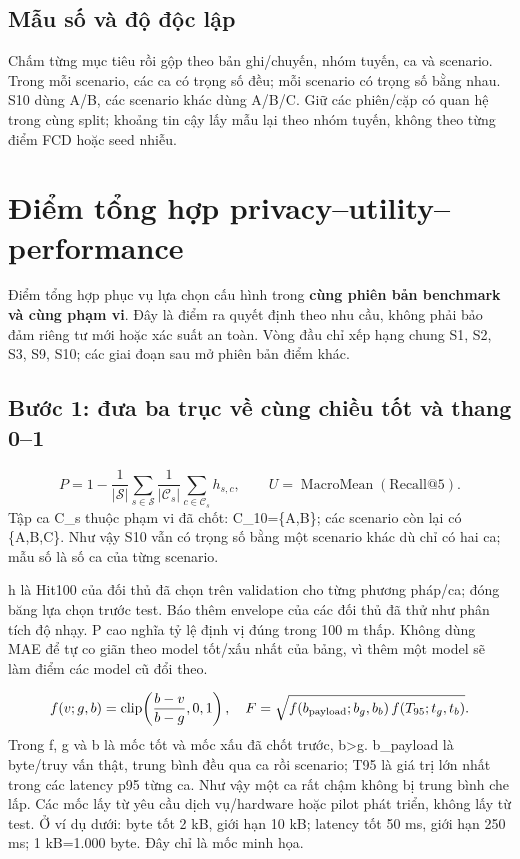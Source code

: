 \documentclass[10pt,a4paper]{article}
\begin{document}
\subsection{Mẫu số và độ độc lập}
Chấm từng mục tiêu rồi gộp theo bản ghi/chuyến, nhóm tuyến, ca và scenario. Trong mỗi scenario, các ca có trọng số đều; mỗi scenario có trọng số bằng nhau. S10 dùng A/B, các scenario khác dùng A/B/C. Giữ các phiên/cặp có quan hệ trong cùng split; khoảng tin cậy lấy mẫu lại theo nhóm tuyến, không theo từng điểm FCD hoặc seed nhiễu.


\clearpage
\section{Điểm tổng hợp privacy–utility–performance}
Điểm tổng hợp phục vụ lựa chọn cấu hình trong \textbf{cùng phiên bản benchmark và cùng phạm vi}. Đây là điểm ra quyết định theo nhu cầu, không phải bảo đảm riêng tư mới hoặc xác suất an toàn. Vòng đầu chỉ xếp hạng chung S1, S2, S3, S9, S10; các giai đoạn sau mở phiên bản điểm khác.

\subsection{Bước 1: đưa ba trục về cùng chiều tốt và thang 0–1}
\[
P=1-\frac{1}{|\mathcal S|}\sum_{s\in\mathcal S}\frac1{|\mathcal C_s|}\sum_{c\in\mathcal C_s}h_{s,c},\qquad U=\operatorname{MacroMean}(\mathrm{Recall@5}).
\]
Tập ca C\_\allowbreak{}s thuộc phạm vi đã chốt: C\_\allowbreak{}10=\{A,B\}; các scenario còn lại có \{A,B,C\}. Như vậy S10 vẫn có trọng số bằng một scenario khác dù chỉ có hai ca; mẫu số là số ca của từng scenario.

h là Hit100 của đối thủ đã chọn trên validation cho từng phương pháp/ca; đóng băng lựa chọn trước test. Báo thêm envelope của các đối thủ đã thử như phân tích độ nhạy. P cao nghĩa tỷ lệ định vị đúng trong 100 m thấp. Không dùng MAE để tự co giãn theo model tốt/xấu nhất của bảng, vì thêm một model sẽ làm điểm các model cũ đổi theo.

\[
f(v;g,b)=\operatorname{clip}\!\left(\frac{b-v}{b-g},0,1\right),\quad F=\sqrt{f(b_{\rm payload};b_g,b_b)\,f(T_{95};t_g,t_b)}.
\]
Trong f, g và b là mốc tốt và mốc xấu đã chốt trước, b>g. b\_\allowbreak{}payload là byte/truy vấn thật, trung bình đều qua ca rồi scenario; T95 là giá trị lớn nhất trong các latency p95 từng ca. Như vậy một ca rất chậm không bị trung bình che lấp. Các mốc lấy từ yêu cầu dịch vụ/hardware hoặc pilot phát triển, không lấy từ test. Ở ví dụ dưới: byte tốt 2 kB, giới hạn 10 kB; latency tốt 50 ms, giới hạn 250 ms; 1 kB=1.000 byte. Đây chỉ là mốc minh họa.
\end{document}
